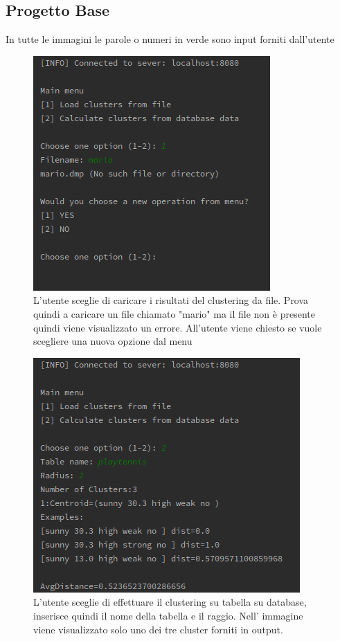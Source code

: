 \documentclass{article}
\begin{document}
            \subsection{Progetto Base}
    In tutte le immagini le parole o numeri in verde sono input forniti
     dall'utente

        \begin{figure}[H]
            \includegraphics[scale=0.9]{BASE1}
            \caption{L'utente sceglie di caricare i risultati del clustering 
            da file. Prova quindi a caricare un file chiamato "mario" ma il file non
            è presente quindi viene visualizzato un errore. All'utente viene
            chiesto se vuole scegliere una nuova opzione dal menu}   
            \label{fig:1}
        \end{figure}

        \begin{figure}[H]
            \includegraphics{BASE2}
            \caption{L'utente sceglie di effettuare il clustering su tabella su
            database, inserisce quindi il nome della tabella e il raggio. Nell'
            immagine viene visualizzato solo uno dei tre cluster forniti in output.}   
            \label{fig:2}
        \end{figure}
\end{document}
